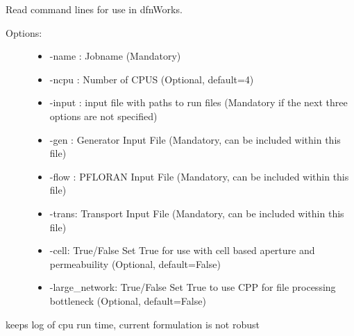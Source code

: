 \documentclass[letterpaper,10pt,english]{sphinxmanual}
\begin{document}
\begin{fulllineitems}
\label{pydfnworks:pydfnworks.helper.commandline_options}
Read command lines for use in dfnWorks.
\begin{description}
\item[{Options:}] \leavevmode\begin{itemize}
\item {} 
-name : Jobname (Mandatory)

\item {} 
-ncpu : Number of CPUS (Optional, default=4)

\item {} 
-input : input file with paths to run files (Mandatory if the next three options are not specified)

\item {} 
-gen : Generator Input File (Mandatory, can be included within this file)

\item {} 
-flow : PFLORAN Input File (Mandatory, can be included within this file)

\item {} 
-trans: Transport Input File (Mandatory, can be included within this file)

\item {} 
-cell: True/False Set True for use with cell based aperture and permeabuility (Optional, default=False)

\item {} 
-large\_network: True/False Set True to use CPP for file processing bottleneck (Optional, default=False)

\end{itemize}

\end{description}

\end{fulllineitems}


\begin{fulllineitems}
\label{pydfnworks:pydfnworks.helper.dump_time}
keeps log of cpu run time, current formulation is not robust

\end{fulllineitems}
\end{document}
